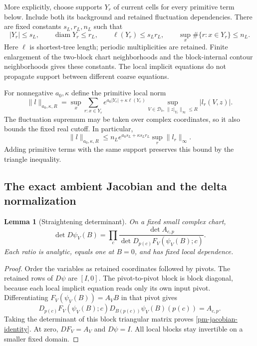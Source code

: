 \documentclass[11pt]{article}
\newtheorem{lemma}[theorem]{Lemma}
\begin{document}
More explicitly, choose supports $Y_r$ of current cells for
every primitive term below. Include both its background and
retained fluctuation dependencies. There are fixed constants
$s_L,r_L,n_L$ such that
\begin{equation}\label{pm-support-bounds}
 |Y_r|\le s_L,\qquad \operatorname{diam}Y_r\le r_L,
 \qquad \ell(Y_r)\le s_Lr_L,\qquad
 \sup_x\#\{r:x\in Y_r\}\le n_L.
\end{equation}
Here $\ell$ is shortest-tree length; periodic multiplicities
are retained. Finite enlargement of the two-block chart
neighborhoods and the block-internal contour neighborhoods
gives these constants. The local implicit equations do not
propagate support between different coarse equations.

For nonnegative $a_0,\kappa$ define the primitive local norm
\begin{equation}\label{pm-local-norm}
 \|l\|_{a_0,\kappa,R}
 =\sup_x\sum_{r:x\in Y_r}
 e^{a_0|Y_r|+\kappa\ell(Y_r)}
 \sup_{V\in\mathcal D_b,\,\|z|_{Y_r}\|_\infty\le R}|l_r(V,z)|.
\end{equation}
The fluctuation supremum may be taken over complex coordinates,
so it also bounds the fixed real cutoff. In particular,
\begin{equation}\label{pm-incidence-bound}
 \|l\|_{a_0,\kappa,R}
 \le n_Le^{a_0s_L+\kappa s_Lr_L}\sup_r\|l_r\|_\infty.
\end{equation}
Adding primitive terms with the same support preserves this
bound by the triangle inequality.

\subsection{The exact ambient Jacobian and the delta normalization}
\label{pm-jacobian-section}

\begin{lemma}[Straightening determinant]\label{pm-jacobian-lemma}
On a fixed small complex chart,
\begin{equation}\label{pm-jacobian-identity}
 \det D\psi_V(B)=\prod_c
 \frac{\det A_{c,p}}
      {\det D_{p(c)}F_V(\psi_V(B);c)}.
\end{equation}
Each ratio is analytic, equals one at $B=0$, and has fixed
local dependence.
\end{lemma}
\begin{proof}
Order the variables as retained coordinates followed by
pivots. The retained rows of $D\psi$ are $[I,0]$.
The pivot-to-pivot block is block diagonal, because each local
implicit equation reads only its own input pivot. Differentiating
$F_V(\psi_V(B))=A_VB$ in that pivot gives
\[
 D_{p(c)}F_V(\psi_V(B);c)
 D_{B(p(c))}\psi_V(B)(p(c))=A_{c,p}.
\]
Taking the determinant of this block triangular matrix proves
\eqref{pm-jacobian-identity}. At zero, $DF_V=A_V$ and
$D\psi=I$. All local blocks stay invertible on a smaller
fixed domain.
\end{proof}
\end{document}
